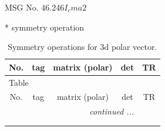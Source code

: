 \documentclass[fleqn,8pt]{jsarticle}
\begin{document}
\setcounter{MaxMatrixCols}{32}

\renewcommand{\tablename}{Table~}
\renewcommand{\figurename}{Figure~}
\begin{center}
\LARGE
MSG No. 46.246\quad$I_{c}ma2$
\end{center}
* symmetry operation
\renewcommand{\arraystretch}{1.3}
\begin{longtable}{ccccc}
\caption{Symmetry operations for 3d polar vector.}
 \\
 \hline \hline
No. & tag & matrix (polar) & det & TR \\ \hline \endfirsthead

\multicolumn{4}{l}{\tablename\ \thetable{}} \\
 \hline \hline
No. & tag & matrix (polar) & det & TR \\ \hline \endhead

 \hline \hline
\multicolumn{4}{r}{\footnotesize\it continued ...} \\ \endfoot

 \hline \hline
\multicolumn{4}{r}{} \\ \endlastfoot


\end{longtable}
\end{document}
